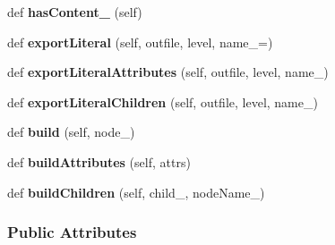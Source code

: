\begin{DoxyCompactItemize}
\item 
def {\bf has\+Content\+\_\+} (self)
\item 
def {\bf export\+Literal} (self, outfile, level, name\+\_\+=\textquotesingle{})
\item 
def {\bf export\+Literal\+Attributes} (self, outfile, level, name\+\_\+)
\item 
def {\bf export\+Literal\+Children} (self, outfile, level, name\+\_\+)
\item 
def {\bf build} (self, node\+\_\+)
\item 
def {\bf build\+Attributes} (self, attrs)
\item 
def {\bf build\+Children} (self, child\+\_\+, node\+Name\+\_\+)
\end{DoxyCompactItemize}
\subsubsection*{Public Attributes}
